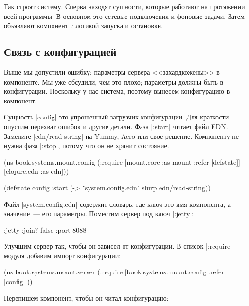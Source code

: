 Так строят систему. Сперва находят сущности, которые работают на протяжении всей
программы. В основном это сетевые подключения и фоновые задачи. Затем объявляют
компонент с логикой запуска и остановки.

\subsection{Связь с конфигурацией}

Выше мы допустили ошибку: параметры сервера <<захардкожены>> в компоненте. Мы
уже обсудили, чем это плохо; параметры должны быть в конфигурации. Поскольку у
нас система, поэтому вынесем конфигурацию в компонент.

Сущность \spverb|config| это упрощенный загрузчик конфигурации. Для краткости
опустим перехват ошибок и другие детали. Фаза \spverb|:start| читает файл
EDN. Замените \spverb|edn/read-string| на Yummy, Aero или свое
решение. Компоненту не нужна фаза \spverb|:stop|, потому что он не хранит
состояние.

\begin{english}
  \begin{clojure}
(ns book.systems.mount.config
  (:require
   [mount.core :as mount :refer [defstate]]
   [clojure.edn :as edn]))

(defstate config
  :start
  (-> "system.config.edn"
      slurp
      edn/read-string))
  \end{clojure}
\end{english}

Файл \spverb|system.config.edn| содержит словарь, где ключ это имя компонента, а
значение~--- его параметры. Поместим сервер под ключ \spverb|:jetty|:

\begin{english}
  \begin{clojure}
{:jetty {:join? false :port 8088}}
  \end{clojure}
\end{english}

Улучшим сервер так, чтобы он зависел от конфигурации. В список \spverb|:require|
модуля добавим импорт конфигурации:

\begin{english}
  \begin{clojure}
(ns book.systems.mount.server
 (:require
  [book.systems.mount.config :refer [config]]))
  \end{clojure}
\end{english}

\noindent
Перепишем компонент, чтобы он читал конфигурацию:

